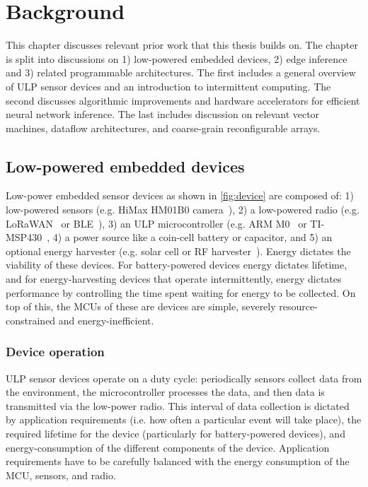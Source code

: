 \chapter{Background}
\label{chapter:background}

This chapter discusses relevant prior work that this thesis builds on.
% 
The chapter is split into discussions on 1) low-powered embedded devices, 2) edge inference and 3) related programmable architectures.
% 
The first includes a general overview of ULP sensor devices and an introduction to intermittent computing.
% 
The second discusses algorithmic improvements and hardware accelerators for efficient neural network inference.
% 
The last includes discussion on relevant vector machines, dataflow architectures, and coarse-grain reconfigurable arrays.

\figDevice
\section{Low-powered embedded devices}

Low-power embedded sensor devices as shown in \autoref{fig:device} are composed of: 1) low-powered sensors (e.g. HiMax HM01B0 camera~\cite{hm01b0}), 2) a low-powered radio (e.g. LoRaWAN~\cite{lorawan} or BLE~\cite{ble}), 3) an ULP microcontroller (e.g. ARM M0~\cite{cortexm0} or TI-MSP430~\cite{msp430fr5994}, 4) a power source like a coin-cell battery or capacitor, and 5) an optional energy harvester (e.g. solar cell or RF harvester~\cite{powercast}).
% 
Energy dictates the viability of these devices.
% 
For battery-powered devices energy dictates lifetime, and for energy-harvesting devices that operate intermittently, energy dictates performance by controlling the time spent waiting for energy to be collected.
% 
On top of this, the MCUs of these are devices are simple, severely resource-constrained and energy-inefficient.

\subsection{Device operation}
% 
ULP sensor devices operate on a duty cycle: periodically sensors collect data from the environment, the microcontroller processes the data, and then data is transmitted via the low-power radio.
% 
This interval of data collection is dictated by application requirements (i.e. how often a particular event will take place), the required lifetime for the device (particularly for battery-powered devices), and energy-consumption of the different components of the device.
% 
% 
Application requirements have to be carefully balanced with the energy consumption of the MCU, sensors, and radio.


